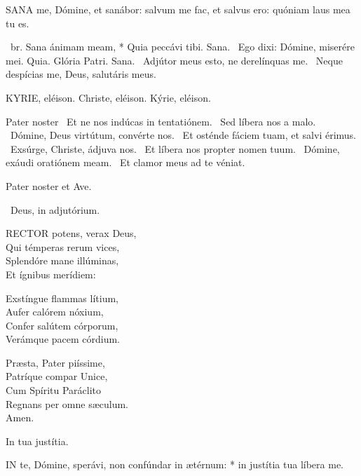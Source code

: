 

\lettrine[lines=2]{S}{ANA} me, Dómine, et sanábor: salvum me fac, et salvus ero: quóniam laus mea tu es.

\R\ br. Sana ánimam meam, * Quia peccávi tibi. Sana. \V\ Ego dixi: Dómine, miserére mei. Quia. Glória Patri. Sana. \V\ Adjútor meus esto, ne derelínquas me. \R\ Neque despícias me, Deus, salutáris meus.



KYRIE, eléison. Christe, eléison. Kýrie, eléison.

Pater noster  \V\ Et ne nos indúcas in tentatiónem. \R\ Sed líbera nos a malo. \V\ Dómine, Deus virtútum, convérte nos. \R\ Et osténde fáciem tuam, et salvi érimus. \V\ Exsúrge, Christe, ádjuva nos. \R\ Et líbera nos propter nomen tuum. \V\ Dómine, exáudi oratiónem meam. \R\ Et clamor meus ad te véniat.



Pater noster et Ave.

\V\ Deus, in adjutórium.


\lettrine[lines=2]{R}{ECTOR} potens, verax Deus,\\
Qui témperas rerum vices,\\
Splendóre mane illúminas,\\
Et ígnibus merídiem:

Exstíngue flammas lítium,\\
Aufer calórem nóxium,\\
Confer salútem córporum,\\
Verámque pacem córdium.

Præsta, Pater piíssime,\\
Patríque compar Unice,\\
Cum Spíritu Paráclito\\
Regnans per omne sæculum.\\
Amen.

 In tua justítia.


\lettrine[lines=2]{I}{N} te, Dómine, sperávi, non confúndar in ætérnum: * in justítia tua líbera me.

